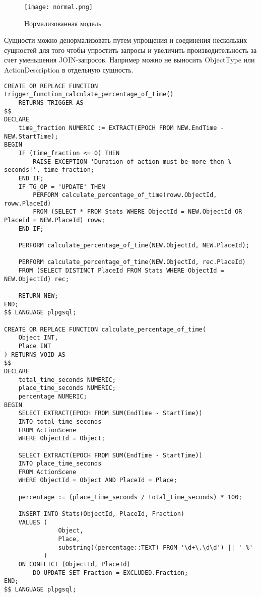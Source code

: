 \begin{figure}[h]
    \centering
    \texttt{[image: normal.png]}
    \caption{Нормализованная модель}
    \label{fig:enter-label}
\end{figure}
\newpage
{}
Сущности можно денормализовать путем упрощения и соединения нескольких сущностей для того чтобы упростить запросы и увеличить производительность за счет уменьшения JOIN-запросов. Например можно не выносить ObjectType или ActionDescription в отдельную сущность.

\newpage
{}

\begin{lstlisting}
CREATE OR REPLACE FUNCTION trigger_function_calculate_percentage_of_time()
    RETURNS TRIGGER AS
$$
DECLARE
    time_fraction NUMERIC := EXTRACT(EPOCH FROM NEW.EndTime - NEW.StartTime);
BEGIN
    IF (time_fraction <= 0) THEN
        RAISE EXCEPTION 'Duration of action must be more then % seconds!', time_fraction;
    END IF;
    IF TG_OP = 'UPDATE' THEN    
        PERFORM calculate_percentage_of_time(roww.ObjectId, roww.PlaceId)
        FROM (SELECT * FROM Stats WHERE ObjectId = NEW.ObjectId OR PlaceId = NEW.PlaceId) roww;
    END IF;

    PERFORM calculate_percentage_of_time(NEW.ObjectId, NEW.PlaceId);

    PERFORM calculate_percentage_of_time(NEW.ObjectId, rec.PlaceId)
    FROM (SELECT DISTINCT PlaceId FROM Stats WHERE ObjectId = NEW.ObjectId) rec;

    RETURN NEW;
END;
$$ LANGUAGE plpgsql;

CREATE OR REPLACE FUNCTION calculate_percentage_of_time(
    Object INT,
    Place INT
) RETURNS VOID AS
$$
DECLARE
    total_time_seconds NUMERIC;
    place_time_seconds NUMERIC;
    percentage NUMERIC;
BEGIN
    SELECT EXTRACT(EPOCH FROM SUM(EndTime - StartTime))
    INTO total_time_seconds
    FROM ActionScene
    WHERE ObjectId = Object;

    SELECT EXTRACT(EPOCH FROM SUM(EndTime - StartTime))
    INTO place_time_seconds
    FROM ActionScene
    WHERE ObjectId = Object AND PlaceId = Place;

    percentage := (place_time_seconds / total_time_seconds) * 100;

    INSERT INTO Stats(ObjectId, PlaceId, Fraction)
    VALUES (
               Object,
               Place,
               substring((percentage::TEXT) FROM '\d+\.\d\d') || ' %'
           )
    ON CONFLICT (ObjectId, PlaceId)
        DO UPDATE SET Fraction = EXCLUDED.Fraction;
END;
$$ LANGUAGE plpgsql;
\end{lstlisting}
